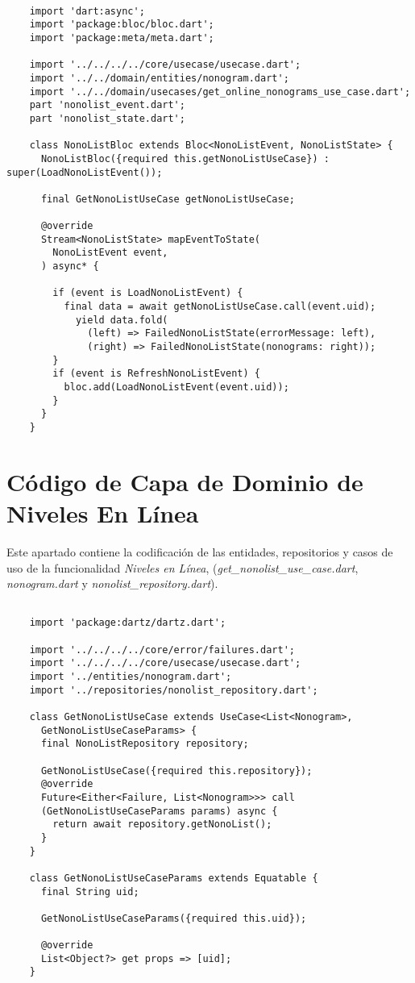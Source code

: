     \begin{lstlisting}

    import 'dart:async';
    import 'package:bloc/bloc.dart';
    import 'package:meta/meta.dart';
    
    import '../../../../core/usecase/usecase.dart';
    import '../../domain/entities/nonogram.dart';
    import '../../domain/usecases/get_online_nonograms_use_case.dart';
    part 'nonolist_event.dart';
    part 'nonolist_state.dart';
    
    class NonoListBloc extends Bloc<NonoListEvent, NonoListState> {
      NonoListBloc({required this.getNonoListUseCase}) : super(LoadNonoListEvent());
    
      final GetNonoListUseCase getNonoListUseCase;
    
      @override
      Stream<NonoListState> mapEventToState(
        NonoListEvent event,
      ) async* {

        if (event is LoadNonoListEvent) {
          final data = await getNonoListUseCase.call(event.uid);
            yield data.fold(
              (left) => FailedNonoListState(errorMessage: left),
              (right) => FailedNonoListState(nonograms: right));
        }
        if (event is RefreshNonoListEvent) {
          bloc.add(LoadNonoListEvent(event.uid));
        }
      }
    }
    \end{lstlisting}

    \section{Código de Capa de Dominio de Niveles En Línea}

    \label{cap:anexo1-3}
    
    Este apartado contiene la codificación de las entidades, repositorios y casos de uso de la 
    funcionalidad \textit{Niveles en Línea}, (\textit{get\_nonolist\_use\_case.dart}, \textit{nonogram.dart} y \textit{nonolist\_repository.dart}).
    
    \begin{lstlisting}
    
    import 'package:dartz/dartz.dart';

    import '../../../../core/error/failures.dart';
    import '../../../../core/usecase/usecase.dart';
    import '../entities/nonogram.dart';
    import '../repositories/nonolist_repository.dart';

    class GetNonoListUseCase extends UseCase<List<Nonogram>, 
      GetNonoListUseCaseParams> {
      final NonoListRepository repository;

      GetNonoListUseCase({required this.repository});
      @override
      Future<Either<Failure, List<Nonogram>>> call
      (GetNonoListUseCaseParams params) async {
        return await repository.getNonoList();
      }
    }

    class GetNonoListUseCaseParams extends Equatable {
      final String uid;

      GetNonoListUseCaseParams({required this.uid});

      @override
      List<Object?> get props => [uid];
    }

    \end{lstlisting}

